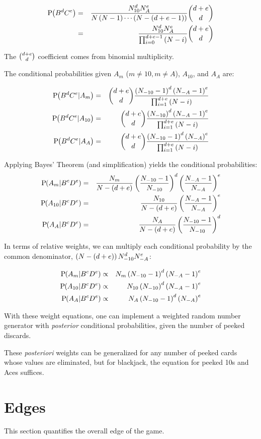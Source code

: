 \begin{eqnarray}
\textrm{P}\hspace{-.5ex}\left(B^d C^e\right) &=& \frac{N_{10}^d N_A^e}{N \left(N-1\right) \cdots \left(N-\left(d+e-1\right)\right)} \binom{d+e}{d} \nonumber \\
&=& \frac{N_{10}^d N_A^e}{\prod_{i=0}^{d+e-1}{\left(N-i\right)}} \binom{d+e}{d}
\end{eqnarray}

\noindent
The $\binom{d+e}{d}$ coefficient comes from binomial multiplicity.

\noindent
The conditional probabilities given $A_m$ ($m\neq{}10,m\neq{}A$), 
$A_{10}$, and $A_A$ are:

\begin{eqnarray}
\textrm{P}\hspace{-.5ex}\left(B^d C^e|A_m\right) &=& \binom{d+e}{d} \frac{\left(N_{-10}-1\right)^d \left(N_{-A}-1\right)^e}{\prod_{i=1}^{d+e}{\left(N-i\right)}}\\
\textrm{P}\hspace{-.5ex}\left(B^d C^e|A_{10}\right) &=& \binom{d+e}{d} \frac{\left(N_{-10}\right)^d \left(N_{-A}-1\right)^e}{\prod_{i=1}^{d+e}{\left(N-i\right)}}\\
\textrm{P}\hspace{-.5ex}\left(B^d C^e|A_A\right) &=& \binom{d+e}{d} \frac{\left(N_{-10}-1\right)^d \left(N_{-A}\right)^e}{\prod_{i=1}^{d+e}{\left(N-i\right)}}
\end{eqnarray}

\noindent
Applying Bayes' Theorem (and simplification) 
yields the conditional probabilities:
\begin{eqnarray}
\textrm{P}\hspace{-.5ex}\left(A_m|B^c D^e\right) &=& \frac{N_m}{N-\left(d+e\right)}
\left(\frac{N_{-10}-1}{N_{-10}}\right)^d
\left(\frac{N_{-A}-1}{N_{-A}}\right)^e\\
\textrm{P}\hspace{-.5ex}\left(A_{10}|B^c D^e\right) &=& \frac{N_{10}}{N-\left(d+e\right)}
\left(\frac{N_{-A}-1}{N_{-A}}\right)^e\\
\textrm{P}\hspace{-.5ex}\left(A_A|B^c D^e\right) &=& \frac{N_A}{N-\left(d+e\right)}
\left(\frac{N_{-10}-1}{N_{-10}}\right)^d
\end{eqnarray}

In terms of relative weights, we can multiply each conditional probability
by the common denominator, $\left(N-\left(d+e\right)\right)N_{-10}^d N_{-A}^e$:

\begin{eqnarray}
\textrm{P}\hspace{-.5ex}\left(A_m|B^c D^e\right) &\propto& N_m \left(N_{-10}-1\right)^d \left(N_{-A}-1\right)^e\\
\textrm{P}\hspace{-.5ex}\left(A_{10}|B^c D^e\right) &\propto& N_{10} \left(N_{-10}\right)^d \left(N_{-A}-1\right)^e\\
\textrm{P}\hspace{-.5ex}\left(A_A|B^c D^e\right) &\propto& N_A \left(N_{-10}-1\right)^d \left(N_{-A}\right)^e
\end{eqnarray}

\noindent
With these weight equations, 
one can implement a weighted random number generator with 
\emph{posterior} conditional probabilities, given the number
of peeked discards.  

These \emph{posteriori} weights can be generalized for any number of
peeked cards whose values are eliminated, but for blackjack, 
the equation for peeked 10s and Aces suffices.  

\section{Edges}
\label{sec:basic:edges}

This section quantifies the overall edge of the game.

